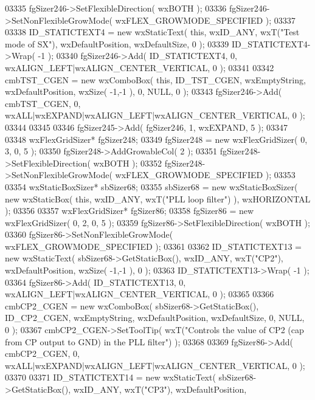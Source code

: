 \begin{DoxyCode}
03335     fgSizer246->SetFlexibleDirection( wxBOTH );
03336     fgSizer246->SetNonFlexibleGrowMode( wxFLEX\_GROWMODE\_SPECIFIED );
03337     
03338     ID_STATICTEXT4 = \textcolor{keyword}{new} wxStaticText( \textcolor{keyword}{this}, wxID\_ANY, wxT(\textcolor{stringliteral}{"Test mode of SX"}), wxDefaultPosition, 
      wxDefaultSize, 0 );
03339     ID_STATICTEXT4->Wrap( -1 );
03340     fgSizer246->Add( ID_STATICTEXT4, 0, wxALIGN\_LEFT|wxALIGN\_CENTER\_VERTICAL, 0 );
03341     
03342     cmbTST_CGEN = \textcolor{keyword}{new} wxComboBox( \textcolor{keyword}{this}, ID_TST_CGEN, wxEmptyString, wxDefaultPosition, wxSize( -1,-1 ), 0, 
      NULL, 0 ); 
03343     fgSizer246->Add( cmbTST_CGEN, 0, wxALL|wxEXPAND|wxALIGN\_LEFT|wxALIGN\_CENTER\_VERTICAL, 0 );
03344     
03345     
03346     fgSizer245->Add( fgSizer246, 1, wxEXPAND, 5 );
03347     
03348     wxFlexGridSizer* fgSizer248;
03349     fgSizer248 = \textcolor{keyword}{new} wxFlexGridSizer( 0, 3, 0, 5 );
03350     fgSizer248->AddGrowableCol( 2 );
03351     fgSizer248->SetFlexibleDirection( wxBOTH );
03352     fgSizer248->SetNonFlexibleGrowMode( wxFLEX\_GROWMODE\_SPECIFIED );
03353     
03354     wxStaticBoxSizer* sbSizer68;
03355     sbSizer68 = \textcolor{keyword}{new} wxStaticBoxSizer( \textcolor{keyword}{new} wxStaticBox( \textcolor{keyword}{this}, wxID\_ANY, wxT(\textcolor{stringliteral}{"PLL loop filter"}) ), 
      wxHORIZONTAL );
03356     
03357     wxFlexGridSizer* fgSizer86;
03358     fgSizer86 = \textcolor{keyword}{new} wxFlexGridSizer( 0, 2, 0, 5 );
03359     fgSizer86->SetFlexibleDirection( wxBOTH );
03360     fgSizer86->SetNonFlexibleGrowMode( wxFLEX\_GROWMODE\_SPECIFIED );
03361     
03362     ID_STATICTEXT13 = \textcolor{keyword}{new} wxStaticText( sbSizer68->GetStaticBox(), wxID\_ANY, wxT(\textcolor{stringliteral}{"CP2"}), wxDefaultPosition,
       wxSize( -1,-1 ), 0 );
03363     ID_STATICTEXT13->Wrap( -1 );
03364     fgSizer86->Add( ID_STATICTEXT13, 0, wxALIGN\_LEFT|wxALIGN\_CENTER\_VERTICAL, 0 );
03365     
03366     cmbCP2_CGEN = \textcolor{keyword}{new} wxComboBox( sbSizer68->GetStaticBox(), ID_CP2_CGEN, wxEmptyString, wxDefaultPosition,
       wxDefaultSize, 0, NULL, 0 ); 
03367     cmbCP2_CGEN->SetToolTip( wxT(\textcolor{stringliteral}{"Controls the value of CP2 (cap from CP output to GND) in the PLL filter"})
       );
03368     
03369     fgSizer86->Add( cmbCP2_CGEN, 0, wxALL|wxEXPAND|wxALIGN\_LEFT|wxALIGN\_CENTER\_VERTICAL, 0 );
03370     
03371     ID_STATICTEXT14 = \textcolor{keyword}{new} wxStaticText( sbSizer68->GetStaticBox(), wxID\_ANY, wxT(\textcolor{stringliteral}{"CP3"}), wxDefaultPosition,

\end{DoxyCode}
